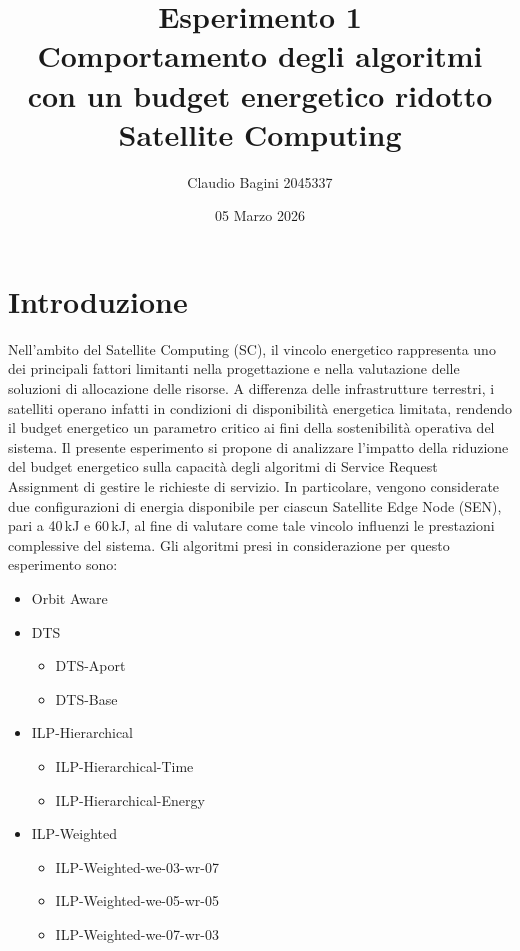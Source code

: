 \documentclass[12pt]{article}
\title{
\textbf{Esperimento 1} \\[0.5em]
\textbf{Comportamento degli algoritmi con un budget energetico ridotto} \\[1em]
Satellite Computing
}
\author{Claudio Bagini 2045337}
\date{05 Marzo 2026}
\begin{document}
\maketitle


\section{Introduzione}

Nell’ambito del Satellite Computing (SC), il vincolo energetico rappresenta uno dei principali fattori limitanti nella progettazione e nella valutazione delle soluzioni di allocazione delle risorse. A differenza delle infrastrutture terrestri, i satelliti operano infatti in condizioni di disponibilità energetica limitata, rendendo il budget energetico un parametro critico ai fini della sostenibilità operativa del sistema.
Il presente esperimento si propone di analizzare l’impatto della riduzione del budget energetico sulla capacità degli algoritmi di Service Request Assignment di gestire le richieste di servizio. In particolare, vengono considerate due configurazioni di energia disponibile per ciascun Satellite Edge Node (SEN), pari a 40\,kJ e 60\,kJ, al fine di valutare come tale vincolo influenzi le prestazioni complessive del sistema. 
Gli algoritmi presi in considerazione per questo esperimento sono:

\begin{itemize}
    \item Orbit Aware
    \item DTS
        \begin{itemize}
            \item DTS-Aport
            \item DTS-Base
        \end{itemize}
    \item ILP-Hierarchical
        \begin{itemize}
            \item ILP-Hierarchical-Time
            \item ILP-Hierarchical-Energy
        \end{itemize}
    \item ILP-Weighted
        \begin{itemize}
            \item ILP-Weighted-we-03-wr-07
            \item ILP-Weighted-we-05-wr-05
            \item ILP-Weighted-we-07-wr-03
        \end{itemize}
        
\end{itemize}
\end{document}
